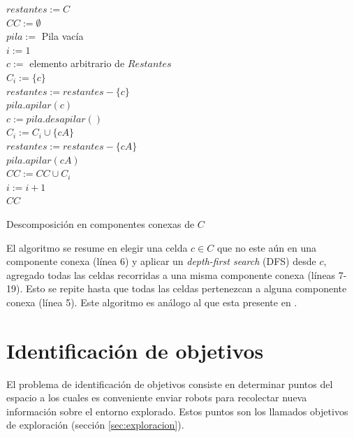 \begin{algorithm}[H]
\SetAlgoLined
  $restantes := C$ \\
  $CC := \emptyset$ \\
  $pila :=$ Pila vacía \\
  $i := 1$ \\
   {
    $c :=$ elemento arbitrario de $Restantes$ \\


    $C_i :=  \{c\}$ \\
    $restantes := restantes - \{c\}$ \\
    $pila.apilar(c)$ \\
     {
      $c := pila.desapilar()$ \\
       {
         {
          $C_i :=  C_i \cup \{cA\}$ \\
          $restantes := restantes - \{cA\}$ \\
          $pila.apilar(cA)$ \\
        }
      }
    }
    $CC := CC \cup C_i$ \\
    $i := i + 1$ \\
  }
  \Return $CC$ 

  \caption{Descomposición en componentes conexas de $C$}
  \label{alg:compcon}
\end{algorithm}

El algoritmo se resume en elegir una celda $c\in C$ que no este aún en una
componente conexa (línea 6) y aplicar un \emph{depth-first search} (DFS) desde
$c$, agregado todas las celdas recorridas a una misma componente conexa (líneas
7-19). Esto se repite hasta que todas las celdas pertenezcan a alguna
componente conexa (línea 5). Este algoritmo es análogo al que esta presente en
\cite{hopcroft1973algorithm}.

\section{Identificación de objetivos}\label{sec:pc:idobj}
El problema de identificación de objetivos consiste en determinar puntos
del espacio a los cuales es conveniente enviar robots para recolectar nueva
información sobre el entorno explorado. Estos puntos son los llamados objetivos
de exploración (sección \ref{sec:exploracion}). 

